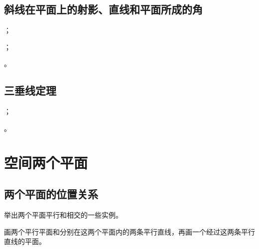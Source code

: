 \subsection{斜线在平面上的射影、直线和平面所成的角}
\begin{Practice}
  \begin{question}
    \item ；
    \item ；
    \item 。
  \end{question}
\end{Practice}
\subsection{三垂线定理}
\begin{Practice}
  \begin{question}
    \item ；
    \item 。
  \end{question}
\end{Practice}
\begin{Exercise}
  \begin{question}
    \item 
    \item 
    \item 
    \item 
    \item 
    \item 
    \item 
    \item 
    \item 
    \item 
  \end{question}
\end{Exercise}

\section{空间两个平面}
\subsection{两个平面的位置关系}
\begin{Practice}
  \begin{question}
    \item 举出两个平面平行和相交的一些实例。
    \item 画两个平行平面和分别在这两个平面内的两条平行直线，再画一个经过这两条平行直线的平面。
  \end{question}
\end{Practice}
